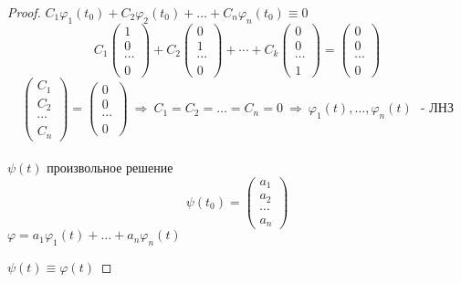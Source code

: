 \begin{proof}
  $C_1 \varphi_1(t_0) + C_2 \varphi_2(t_0) + \ldots + C_n \varphi_n(t_0)
  \equiv 0$
  $$
  C_1
  \left(
  \begin{array}{c}
    1 \\
    0 \\
    \cdots \\
    0
  \end{array}
  \right) +
  C_2
  \left(
  \begin{array}{c}
    0 \\
    1 \\
    \cdots \\
    0
  \end{array}
  \right) + \cdots +
  C_k
  \left(
  \begin{array}{c}
    0 \\
    0 \\
    \cdots \\
    1
  \end{array}
  \right) =
  \left(
  \begin{array}{c}
    0 \\
    0 \\
    \cdots \\
    0
  \end{array}
  \right)
  $$
  $$
  \left(
  \begin{array}{c}
    C_1 \\
    C_2 \\
    \cdots \\
    C_n
  \end{array}
  \right) =
  \left(
  \begin{array}{c}
    0 \\
    0 \\
    \cdots \\
    0
  \end{array}
  \right) ~ \Rightarrow ~ C_1 = C_2 = \ldots = C_n = 0 ~ \Rightarrow ~
  \varphi_1(t), \ldots, \varphi_n(t) ~~~ \text{- ЛНЗ}
  $$\\

  $\psi(t)$ произвольное решение
  $$
  \psi(t_0) =
  \left(
  \begin{array}{c}
    a_1 \\
    a_2 \\
    \cdots \\
    a_n
  \end{array}
  \right)
  $$
  $\varphi = a_1 \varphi_1(t) + \ldots + a_n \varphi_n(t)$

  $\psi(t) \equiv \varphi(t)$


\end{proof}

